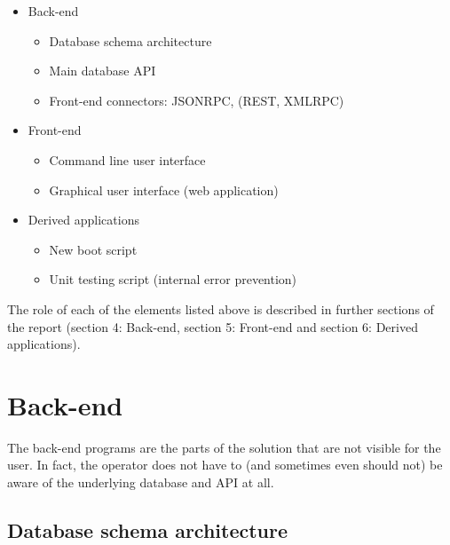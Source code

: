 \documentclass{customization}
\begin{document}
\begin{itemize}
    \item Back-end
        \begin{itemize}
            \item Database schema architecture
            \item Main database API
            \item Front-end connectors: JSONRPC, (REST, XMLRPC)
        \end{itemize}
    \item Front-end
        \begin{itemize}
            \item Command line user interface
            \item Graphical user interface (web application)
        \end{itemize}
    \item Derived applications
        \begin{itemize}
            \item New boot script
            \item Unit testing script (internal error prevention)
        \end{itemize}
\end{itemize}

\vspace{1cm}
\noindent
The role of each of the elements listed above is described in further sections of the report (section 4: Back-end, section 5: Front-end and section 6: Derived applications).


\newpage
\section{Back-end}
\hspace{0.6cm}

The back-end programs are the parts of the solution that are not visible for the user. In fact, the operator does not have to (and sometimes even should not) be aware of the underlying database and API at all.

\subsection{Database schema architecture}
\hspace{0.6cm}
\end{document}
